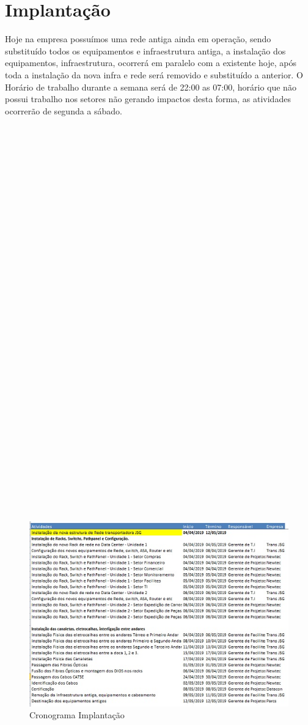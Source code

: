 \documentclass[	DIV=calc,%
							paper=a4,%
							fontsize=12pt,%
							onecolumn]{scrartcl}	 					%
\begin{document}
 \section{Implantação}
Hoje na empresa possuímos uma rede antiga ainda em operação, sendo substituído todos os equipamentos e infraestrutura antiga, a instalação dos equipamentos, infraestrutura, ocorrerá em paralelo com a existente hoje, após toda a instalação da nova infra e rede será removido e substituído a anterior.
O Horário de trabalho durante a semana será de 22:00 as 07:00, horário que não possui trabalho nos setores não gerando impactos desta forma, as atividades ocorrerão de segunda a sábado.
\\
\\
\\
\\
\\
\\
\\
\\
\\
\\
\\
\\
\\
\\
\\
\\
\\
\\
\\
\\
\\
\\
\\
\\
\\
\\
\\
\\
\\
\\
\\
\\
\\
\
 \begin{figure}
	\centering
	\includegraphics[]{fig13}
	\caption{Cronograma Implantação}
	\label{fig13}
\end{figure} 
\end{document}
